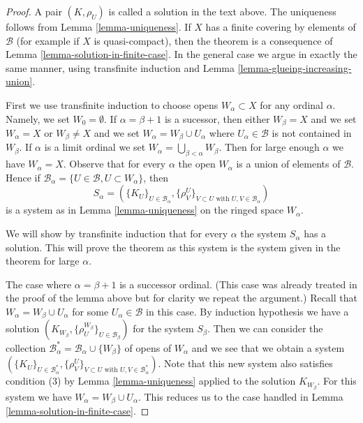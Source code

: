 \begin{proof}
A pair $(K, \rho_U)$ is called a solution in the text above.
The uniqueness follows from Lemma \ref{lemma-uniqueness}.
If $X$ has a finite covering by elements of $\mathcal{B}$
(for example if $X$ is quasi-compact), then the theorem
is a consequence of Lemma \ref{lemma-solution-in-finite-case}.
In the general case we argue in exactly the same manner,
using transfinite induction and
Lemma \ref{lemma-glueing-increasing-union}.

\medskip\noindent
First we use transfinite induction to choose opens $W_\alpha \subset X$
for any ordinal $\alpha$. Namely, we set $W_0 = \emptyset$.
If $\alpha = \beta + 1$ is a sucessor, then either $W_\beta = X$
and we set $W_\alpha = X$ or $W_\beta \not = X$ and we set
$W_\alpha = W_\beta \cup U_\alpha$ where
$U_\alpha \in \mathcal{B}$ is not contained in $W_\beta$.
If $\alpha$ is a limit ordinal we set
$W_\alpha = \bigcup_{\beta < \alpha} W_\beta$.
Then for large enough $\alpha$ we have $W_\alpha = X$.
Observe that for every $\alpha$ the open $W_\alpha$ is
a union of elements of $\mathcal{B}$. Hence if
$\mathcal{B}_\alpha = \{U \in \mathcal{B}, U \subset W_\alpha\}$, then
$$
S_\alpha = (\{K_U\}_{U \in \mathcal{B}_\alpha},
\{\rho_V^U\}_{V \subset U\text{ with }U, V \in \mathcal{B}_\alpha})
$$
is a system as in Lemma \ref{lemma-uniqueness} on the ringed space $W_\alpha$.

\medskip\noindent
We will show by transfinite induction that for every $\alpha$
the system $S_\alpha$ has a solution. This will prove the theorem
as this system is the system given in the theorem for large $\alpha$.

\medskip\noindent
The case where $\alpha = \beta + 1$ is a successor ordinal.
(This case was already treated in the proof of the lemma above
but for clarity we repeat the argument.)
Recall that $W_\alpha = W_\beta \cup U_\alpha$ for some
$U_\alpha \in \mathcal{B}$ in this case.
By induction hypothesis we have a solution
$(K_{W_\beta}, \{\rho^{W_\beta}_U\}_{U \in \mathcal{B}_\beta})$
for the system $S_\beta$.
Then we can consider the collection
$\mathcal{B}_\alpha^* = \mathcal{B}_\alpha \cup \{W_\beta\}$
of opens of $W_\alpha$ and we see that we obtain a system
$(\{K_U\}_{U \in \mathcal{B}_\alpha^*},
\{\rho_V^U\}_{V \subset U\text{ with }U, V \in \mathcal{B}_\alpha^*})$.
Note that this new system also satisfies condition (3)
by Lemma \ref{lemma-uniqueness} applied to the solution $K_{W_\beta}$.
For this system we have $W_\alpha = W_\beta \cup U_\alpha$.
This reduces us to the case handled in
Lemma \ref{lemma-solution-in-finite-case}.


\end{proof}
